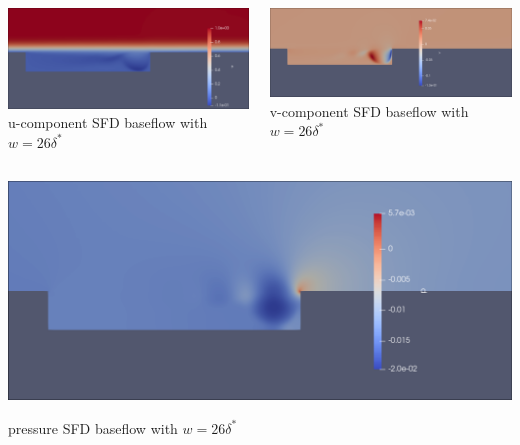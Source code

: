 \documentclass[
  aspectratio=169, %
  t, %
  onlytextwidth, %
  10pt, %
]{beamer}
\begin{document}
\begin{frame}
  \begin{columns}[T] %
    \begin{column}{0.48\linewidth} %
      {
	\centering
	\includegraphics[width=\linewidth]{Images/ubf26.png}
	u-component SFD baseflow with $w = 26\delta^*$
      }
    \end{column}
    \begin{column}{0.48\linewidth} %
      {
	\centering
	\includegraphics[width=\linewidth]{Images/vbf26.png}
	v-component SFD baseflow with $w = 26\delta^*$
      }
    \end{column}
  \end{columns}
      {
	\centering
	\includegraphics[width=0.48\linewidth]{Images/pbf26.png}

	\centerline{
	pressure SFD baseflow with $w = 26\delta^*$}
      }
\end{frame}
\end{document}
